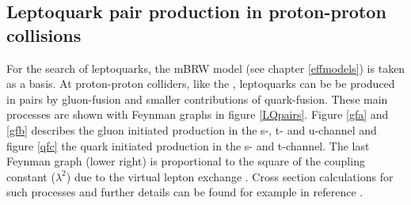 \subsection{Leptoquark pair production in proton-proton collisions}\label{LQpp}
For the search of leptoquarks, the mBRW model (see chapter \ref{effmodels}) is taken as a basis.\newline 
At proton-proton colliders, like the {\LHC}, leptoquarks can be be produced in pairs by gluon-fusion and smaller contributions of quark-fusion. These main processes are shown with Feynman graphs in figure \ref{LQpairs}. Figure \ref{gfa} and \ref{gfb} describes the gluon initiated production in the s-, t- and u-channel and figure \ref{qfc} the quark initiated production in the s- and t-channel. The last Feynman graph (lower right) is proportional to the square of the coupling constant ($\lambda^2$) due to the virtual lepton exchange \cite{hunter}\cite{Hewett}. Cross section calculations for such processes and further details can be found for example in reference \cite{Kramer}.  
%
